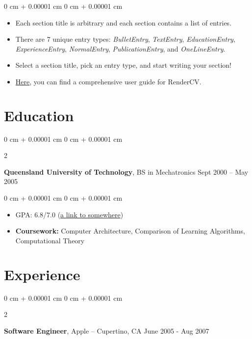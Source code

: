 \documentclass[10pt, letterpaper]{article}
\newenvironment{highlights}{
    \begin{itemize}[
        topsep=0.10 cm,
        parsep=0.10 cm,
        partopsep=0pt,
        itemsep=0pt,
        leftmargin=0 cm + 10pt
    ]
}{
    \end{itemize}
} %
\newenvironment{highlightsforbulletentries}{
    \begin{itemize}[
        topsep=0.10 cm,
        parsep=0.10 cm,
        partopsep=0pt,
        itemsep=0pt,
        leftmargin=10pt
    ]
}{
    \end{itemize}
} %
\newenvironment{onecolentry}{
    \begin{adjustwidth}{
        0 cm + 0.00001 cm
    }{
        0 cm + 0.00001 cm
    }
}{
    \end{adjustwidth}
} %
\newenvironment{twocolentry}[2][]{
    \onecolentry
    \def\secondColumn{#2}
    \setcolumnwidth{\fill, 4.5 cm}
    \begin{paracol}{2}
}{
    \switchcolumn \raggedleft \secondColumn
    \end{paracol}
    \endonecolentry
} %
\begin{document}
\begin{onecolentry}
      \begin{highlightsforbulletentries}

            \item Each section title is arbitrary and each section contains a list of entries.

            \item There are 7 unique entry types: \textit{BulletEntry}, \textit{TextEntry},
            \textit{EducationEntry}, \textit{ExperienceEntry}, \textit{NormalEntry},
            \textit{PublicationEntry}, and \textit{OneLineEntry}.

            \item Select a section title, pick an entry type, and start writing your section!

            \item \href{https://docs.rendercv.com/user_guide/}{Here}, you can find a comprehensive user guide for RenderCV.

      \end{highlightsforbulletentries}
\end{onecolentry}

\section{Education}

\begin{twocolentry}{
            Sept 2000 – May 2005
      }
      \textbf{Queensland University of Technology}, BS in Mechatronics\end{twocolentry}

\vspace{0.10 cm}
\begin{onecolentry}
      \begin{highlights}
            \item GPA: 6.8/7.0 (\href{https://example.com}{a link to somewhere})
            \item \textbf{Coursework:} Computer Architecture, Comparison of Learning Algorithms, Computational Theory
      \end{highlights}
\end{onecolentry}

\section{Experience}

\begin{twocolentry}{
            June 2005 - Aug 2007
      }
      \textbf{Software Engineer}, Apple -- Cupertino, CA\end{twocolentry}
\end{document}

